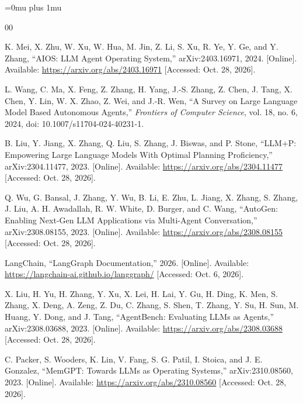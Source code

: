 {\small
\setlength{\bibhang}{1.27cm}
\setlength{\bibsep}{0.35\baselineskip}
\Urlmuskip=0mu plus 1mu
\def\UrlBreaks{\do\/\do\-\do\_\do\.\do\?\do\&\do\=\do\#}

\begin{thebibliography}{00}

 K. Mei, X. Zhu, W. Xu, W. Hua, M. Jin, Z. Li, S. Xu, R. Ye, Y. Ge, and Y. Zhang, ``AIOS: LLM Agent Operating System,'' arXiv:2403.16971, 2024. [Online]. Available: \url{https://arxiv.org/abs/2403.16971} [Accessed: Oct. 28, 2026].

 L. Wang, C. Ma, X. Feng, Z. Zhang, H. Yang, J.-S. Zhang, Z. Chen, J. Tang, X. Chen, Y. Lin, W. X. Zhao, Z. Wei, and J.-R. Wen, ``A Survey on Large Language Model Based Autonomous Agents,'' \emph{Frontiers of Computer Science}, vol. 18, no. 6, 2024, doi: 10.1007/s11704-024-40231-1.

 B. Liu, Y. Jiang, X. Zhang, Q. Liu, S. Zhang, J. Biswas, and P. Stone, ``LLM+P: Empowering Large Language Models With Optimal Planning Proficiency,'' arXiv:2304.11477, 2023. [Online]. Available: \url{https://arxiv.org/abs/2304.11477} [Accessed: Oct. 28, 2026].

 Q. Wu, G. Bansal, J. Zhang, Y. Wu, B. Li, E. Zhu, L. Jiang, X. Zhang, S. Zhang, J. Liu, A. H. Awadallah, R. W. White, D. Burger, and C. Wang, ``AutoGen: Enabling Next-Gen LLM Applications via Multi-Agent Conversation,'' arXiv:2308.08155, 2023. [Online]. Available: \url{https://arxiv.org/abs/2308.08155} [Accessed: Oct. 28, 2026].

 LangChain, ``LangGraph Documentation,'' 2026. [Online]. Available: \url{https://langchain-ai.github.io/langgraph/} [Accessed: Oct. 6, 2026].

 X. Liu, H. Yu, H. Zhang, Y. Xu, X. Lei, H. Lai, Y. Gu, H. Ding, K. Men, S. Zhang, X. Deng, A. Zeng, Z. Du, C. Zhang, S. Shen, T. Zhang, Y. Su, H. Sun, M. Huang, Y. Dong, and J. Tang, ``AgentBench: Evaluating LLMs as Agents,'' arXiv:2308.03688, 2023. [Online]. Available: \url{https://arxiv.org/abs/2308.03688} [Accessed: Oct. 28, 2026].

 C. Packer, S. Wooders, K. Lin, V. Fang, S. G. Patil, I. Stoica, and J. E. Gonzalez, ``MemGPT: Towards LLMs as Operating Systems,'' arXiv:2310.08560, 2023. [Online]. Available: \url{https://arxiv.org/abs/2310.08560} [Accessed: Oct. 28, 2026].


\end{thebibliography}}
